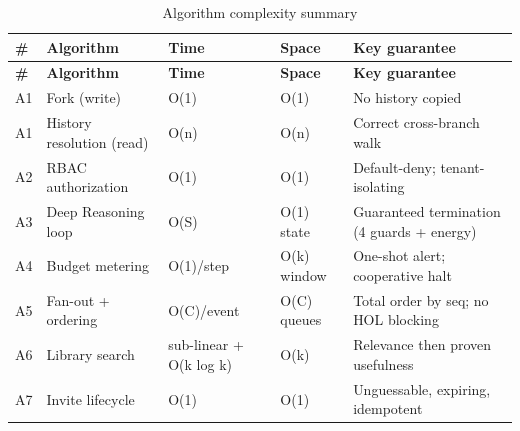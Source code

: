 \documentclass[12pt,a4paper]{report}
\begin{document}
\begingroup
\setlength{\parskip}{0pt}\renewcommand{\arraystretch}{1.32}\footnotesize
\begin{xltabular}{\textwidth}{>{\hsize\raggedright\arraybackslash}X >{\hsize\raggedright\arraybackslash}X >{\hsize\raggedright\arraybackslash}X >{\hsize\raggedright\arraybackslash}X >{\hsize\raggedright\arraybackslash}X}
\caption{Algorithm complexity summary}\\
\toprule
\textbf{\#} & \textbf{Algorithm} & \textbf{Time} & \textbf{Space} & \textbf{Key guarantee} \\
\midrule\endfirsthead
\toprule
\textbf{\#} & \textbf{Algorithm} & \textbf{Time} & \textbf{Space} & \textbf{Key guarantee} \\
\midrule\endhead
\bottomrule\endfoot
A1 & Fork (write) & O(1) & O(1) & No history copied \\
A1 & History resolution (read) & O(n) & O(n) & Correct cross-branch walk \\
A2 & RBAC authorization & O(1) & O(1) & Default-deny; tenant-isolating \\
A3 & Deep Reasoning loop & O(S) & O(1) state & Guaranteed termination (4 guards + energy) \\
A4 & Budget metering & O(1)/step & O(k) window & One-shot alert; cooperative halt \\
A5 & Fan-out + ordering & O(C)/event & O(C) queues & Total order by seq; no HOL blocking \\
A6 & Library search & sub-linear + O(k log k) & O(k) & Relevance then proven usefulness \\
A7 & Invite lifecycle & O(1) & O(1) & Unguessable, expiring, idempotent \\
\end{xltabular}
\endgroup
\end{document}
